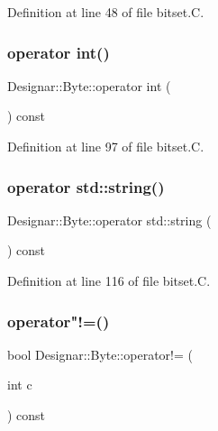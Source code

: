 Definition at line 48 of file bitset.\+C.

\mbox{\label{class_designar_1_1_byte_a807f2afe5c5d15112b2a349e54142265}} 
\subsubsection{\texorpdfstring{operator int()}{operator int()}}
{\footnotesize\ttfamily Designar\+::\+Byte\+::operator int (\begin{DoxyParamCaption}{ }\end{DoxyParamCaption}) const}



Definition at line 97 of file bitset.\+C.

\mbox{\label{class_designar_1_1_byte_ac37e3eaea04d1bdb09b04a1dd94a852d}} 
\subsubsection{\texorpdfstring{operator std\+::string()}{operator std::string()}}
{\footnotesize\ttfamily Designar\+::\+Byte\+::operator std\+::string (\begin{DoxyParamCaption}{ }\end{DoxyParamCaption}) const}



Definition at line 116 of file bitset.\+C.

\mbox{\label{class_designar_1_1_byte_a24733d65e2f520be23ae6eb55ca195c1}} 
\subsubsection{\texorpdfstring{operator"!=()}{operator!=()}}
{\footnotesize\ttfamily bool Designar\+::\+Byte\+::operator!= (\begin{DoxyParamCaption}\item[{int}]{c }\end{DoxyParamCaption}) const}



